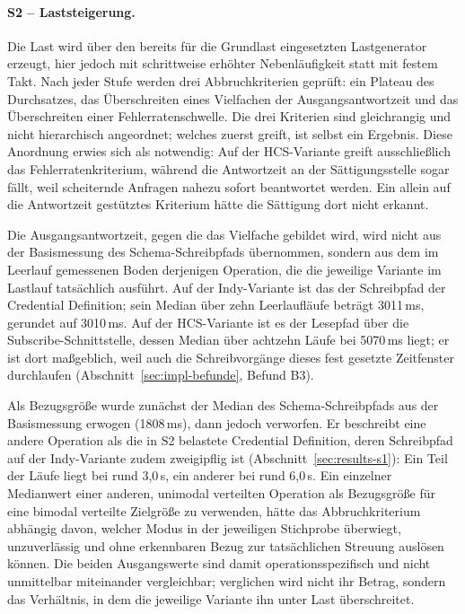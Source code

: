 \paragraph{S2 -- Laststeigerung.} Die Last wird über den bereits für die Grundlast eingesetzten Lastgenerator erzeugt, hier jedoch mit schrittweise erhöhter Nebenläufigkeit statt mit festem Takt. Nach jeder Stufe werden drei Abbruchkriterien geprüft: ein Plateau des Durchsatzes, das Überschreiten eines Vielfachen der Ausgangsantwortzeit und das Überschreiten einer Fehlerratenschwelle. Die drei Kriterien sind gleichrangig und nicht hierarchisch angeordnet; welches zuerst greift, ist selbst ein Ergebnis. Diese Anordnung erwies sich als notwendig: Auf der HCS-Variante greift ausschließlich das Fehlerratenkriterium, während die Antwortzeit an der Sättigungsstelle sogar fällt, weil scheiternde Anfragen nahezu sofort beantwortet werden. Ein allein auf die Antwortzeit gestütztes Kriterium hätte die Sättigung dort nicht erkannt.

Die Ausgangsantwortzeit, gegen die das Vielfache gebildet wird, wird nicht aus der Basismessung des Schema-Schreibpfads übernommen, sondern aus dem im Leerlauf gemessenen Boden derjenigen Operation, die die jeweilige Variante im Lastlauf tatsächlich ausführt. Auf der Indy-Variante ist das der Schreibpfad der Credential Definition; sein Median über zehn Leerlaufläufe beträgt 3011\,ms, gerundet auf 3010\,ms. Auf der HCS-Variante ist es der Lesepfad über die Subscribe-Schnittstelle, dessen Median über achtzehn Läufe bei 5070\,ms liegt; er ist dort maßgeblich, weil auch die Schreibvorgänge dieses fest gesetzte Zeitfenster durchlaufen (Abschnitt~\ref{sec:impl-befunde}, Befund B3).

Als Bezugsgröße wurde zunächst der Median des Schema-Schreibpfads aus der Basismessung erwogen (1808\,ms), dann jedoch verworfen. Er beschreibt eine andere Operation als die in S2 belastete Credential Definition, deren Schreibpfad auf der Indy-Variante zudem zweigipflig ist (Abschnitt~\ref{sec:results-s1}): Ein Teil der Läufe liegt bei rund 3,0\,s, ein anderer bei rund 6,0\,s. Ein einzelner Medianwert einer anderen, unimodal verteilten Operation als Bezugsgröße für eine bimodal verteilte Zielgröße zu verwenden, hätte das Abbruchkriterium abhängig davon, welcher Modus in der jeweiligen Stichprobe überwiegt, unzuverlässig und ohne erkennbaren Bezug zur tatsächlichen Streuung auslösen können. Die beiden Ausgangswerte sind damit operationsspezifisch und nicht unmittelbar miteinander vergleichbar; verglichen wird nicht ihr Betrag, sondern das Verhältnis, in dem die jeweilige Variante ihn unter Last überschreitet.

